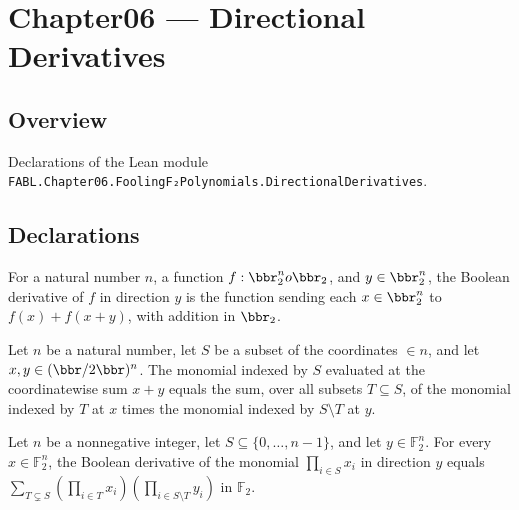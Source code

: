 \chapter{Chapter06 — Directional Derivatives}
\section{Overview}

Declarations of the Lean module \texttt{FABL.Chapter06.FoolingF₂Polynomials.DirectionalDerivatives}.

\section{Declarations}

\begin{definition}
\label{FABL.booleanDerivative}
\leanok
{}
For a natural number $n$, a function $f:\bbr_2^n	o\bbr_2$, and $y\in\bbr_2^n$, the Boolean
derivative of $f$ in direction $y$ is the function sending each $x\in\bbr_2^n$ to
$f(x)+f(x+y)$, with addition in $\bbr_2$.
\end{definition}

\begin{theorem}
\label{FABL.anfMonomial_add}
\leanok
{}
Let $n$ be a natural number, let $S$ be a subset of the coordinates $\in n$, and let
$x,y\in(\bbr/2\bbr)^n$. The monomial indexed by $S$ evaluated at the coordinatewise
sum $x+y$ equals the sum, over all subsets $T\subseteq S$, of the monomial indexed by
$T$ at $x$ times the monomial indexed by $S\setminus T$ at $y$.
\end{theorem}

\begin{theorem}
\label{FABL.booleanDerivative_anfMonomial}
\leanok
{}
Let $n$ be a nonnegative integer, let $S\subseteq\{0,\ldots,n-1\}$, and let
$y\in\mathbb{F}_2^n$. For every $x\in\mathbb{F}_2^n$, the Boolean derivative of the
monomial $\prod_{i\in S}x_i$ in direction $y$ equals $\displaystyle\sum_{T\subsetneq
S}\left(\prod_{i\in T}x_i\right)\left(\prod_{i\in S\setminus T}y_i\right)$ in
$\mathbb{F}_2$.
\end{theorem}

